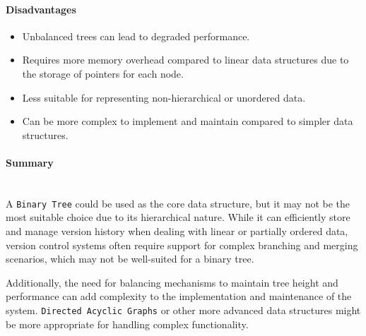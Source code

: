 \paragraph{Disadvantages}
\begin{itemize}
    \item Unbalanced trees can lead to degraded performance.
    \item Requires more memory overhead compared to linear data structures due to the storage of pointers for each node.
    \item Less suitable for representing non-hierarchical or unordered data.
    \item Can be more complex to implement and maintain compared to simpler data structures.
\end{itemize}

\paragraph{Summary}
\hfill\medskip\\
A \lstinline{Binary Tree} could be used as the core data structure, but it may not be the most suitable choice due to its hierarchical nature. While it can efficiently store and manage version history when dealing with linear or partially ordered data, version control systems often require support for complex branching and merging scenarios, which may not be well-suited for a binary tree.
\smallskip

Additionally, the need for balancing mechanisms to maintain tree height and performance can add complexity to the implementation and maintenance of the system. \lstinline{Directed Acyclic Graphs} or other more advanced data structures might be more appropriate for handling complex functionality.

